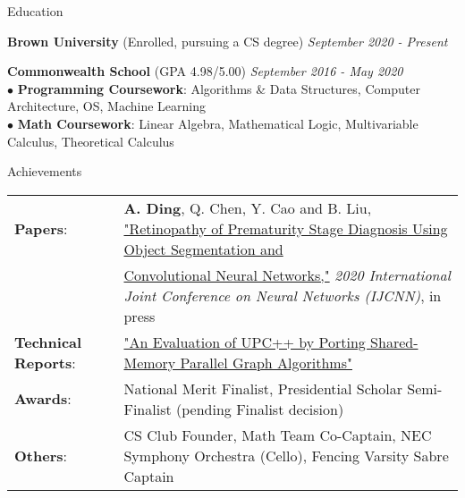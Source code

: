 \documentclass{resume} %
\begin{document}
\begin{rSection}{Education}

{\bf Brown University} {\small (Enrolled, pursuing a CS degree)} \hfill {\em September 2020 - Present} 

{\bf Commonwealth School} {\small (GPA 4.98/5.00)}  \hfill {\em September 2016 - May 2020} 
\\$\bullet$ \textbf{Programming Coursework}: Algorithms \& Data Structures, Computer Architecture, OS, Machine Learning
\\$\bullet$ \textbf{Math Coursework}: Linear Algebra, Mathematical Logic, Multivariable Calculus, Theoretical Calculus

\end{rSection}

\begin{rSection}{Achievements}
\begin{tabular}{@{}l@{}l@{}}
    {\bf Papers}:~ & {\bf A. Ding}, Q. Chen, Y. Cao and B. Liu, \href{https://www.researchgate.net/publication/340452614\_Retinopathy\_of\_Prematurity\_Stage\_Diagnosis\_Using\_Object\_Segmentation\_and\_Convolutional\_Neural\_Networks}{"Retinopathy of Prematurity Stage Diagnosis Using Object Segmentation and } \\
    & \href{https://www.researchgate.net/publication/340452614\_Retinopathy\_of\_Prematurity\_Stage\_Diagnosis\_Using\_Object\_Segmentation\_and\_Convolutional\_Neural\_Networks}{Convolutional Neural Networks,"} \textit{2020 International Joint Conference on Neural Networks (IJCNN)}, in press \\
    {\bf Technical Reports}:~ & \href{https://math.mit.edu/research/highschool/primes/materials/2019/Ding.pdf}{"An Evaluation of UPC++ by Porting Shared-Memory Parallel Graph Algorithms"} \\
    {\bf Awards}:~ & National Merit Finalist, Presidential Scholar Semi-Finalist {\small (pending Finalist decision)} \\
    {\bf Others}:~ & CS Club Founder, Math Team Co-Captain, NEC Symphony Orchestra (Cello), Fencing Varsity Sabre Captain
\end{tabular}
\end{rSection}
\end{document}
